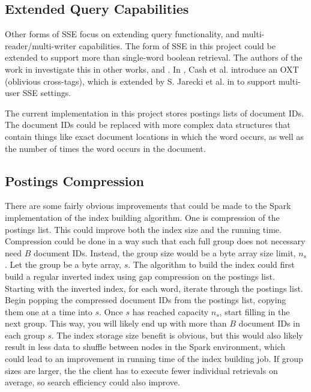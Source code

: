 \documentclass{sig-alternate-05-2015}
\begin{document}
\subsection{Extended Query Capabilities}
Other forms of SSE focus on extending query functionality, and multi-reader/multi-writer capabilities. The form of SSE in this project could be extended to support more than single-word boolean retrieval. The authors of the work in \cite{davidcashetal.2014} investigate this in other works, \cite{jarecki.2013} and \cite{davidcashetal.2013}. In \cite{jarecki.2013}, Cash et al. introduce an OXT (oblivious cross-tags), which is extended by S. Jarecki et al. in \cite{davidcashetal.2013} to support multi-user SSE settings.

The current implementation in this project stores postings lists of document IDs. The document IDs could be replaced with more complex data structures that contain things like exact document locations in which the word occurs, as well as the number of times the word occurs in the document.

\subsection{Postings Compression}
There are some fairly obvious improvements that could be made to the Spark implementation of the index building algorithm. One is compression of the postings list. This could improve both the index size and the running time. Compression could be done in a way such that each full group does not necessary need $B$ document IDs. Instead, the group size would be a byte array size limit, $n_s$. Let the group be a byte array, $s$. The algorithm to build the index could first build a regular inverted index using gap compression on the postings list. Starting with the inverted index, for each word, iterate through the postings list. Begin popping the compressed document IDs from the postings list, copying them one at a time into $s$. Once $s$ has reached capacity $n_s$, start filling in the next group. This way, you will likely end up with more than $B$ document IDs in each group $s$. The index storage size benefit is obvious, but this would also likely result in less data to shuffle between nodes in the Spark environment, which could lead to an improvement in running time of the index building job. If group sizes are larger, the the client has to execute fewer individual retrievals on average, so search efficiency could also improve.
\end{document}
